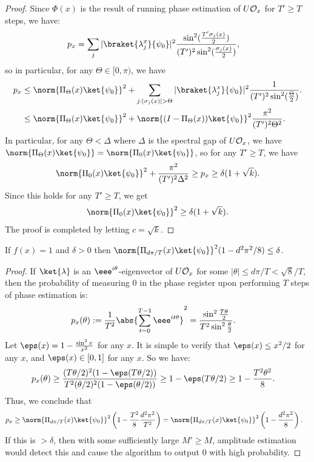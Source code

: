 \documentclass{toc}
\begin{document}
\begin{proof}
Since $\Phi(x)$ is the result of running phase estimation of $U{\cal O}_x$ for $T'\geq T$ steps, we have:
\begin{align*}
p_x &= \sum_j|\braket{\lambda_j^x}{\psi_0}|^2\frac{\sin^2(\frac{T'\sigma_j(x)}{2})}{(T')^2\sin^2(\frac{\sigma_j(x)}{2})},
\end{align*}
so in particular, for any $\Theta\in [0,\pi)$, we have
\begin{align*}
p_x &\leq \norm{\Pi_{\Theta}(x)\ket{\psi_0}}^2+\sum_{j:|\sigma_j(x)|>\Theta}|\braket{\lambda_j^x}{\psi_0}|^2\frac{1}{(T')^2\sin^2(\frac{\Theta}{2})}.\\
&\leq \norm{\Pi_\Theta(x)\ket{\psi_0}}^2 + \norm{(I-\Pi_\Theta(x))\ket{\psi_0}}^2\frac{\pi^2}{(T')^2\Theta^2}.
\end{align*}
In particular, for any $\Theta<\Delta$ where $\Delta$ is the spectral gap of $U{\cal O}_x$, we have $\norm{\Pi_\Theta(x)\ket{\psi_0}}=\norm{\Pi_0(x)\ket{\psi_0}}$, so for any $T'\geq T$, we have
$$\norm{\Pi_0(x)\ket{\psi_0}}^2+\frac{\pi^2}{(T')^2\Delta^2}\geq p_x\geq  \delta(1+\sqrt{k}).$$
Since this holds for any $T'\geq T$, we get
$$\norm{\Pi_0(x)\ket{\psi_0}}^2 \geq \delta(1+\sqrt{k}).$$
The proof is completed by letting $c=\sqrt{k}$.
\end{proof}

\begin{claim}
If $f(x)=1$ and $\delta>0$ then $\norm{\Pi_{d\pi/T}(x)\ket{\psi_0}}^2(1-d^2\pi^2/8)\leq \delta$.
\end{claim}
\begin{proof}
If $\ket{\lambda}$ is an $\eee^{i\theta}$-eigenvector of $U{\cal O}_x$ for some $|\theta|\leq d\pi/T < \sqrt{8}/T$, then the probability of measuring 0 in the phase register upon performing $T$ steps of phase estimation is:
\begin{align*}
p_x(\theta):=\frac{1}{T^2}\abs{\sum_{t=0}^{T-1}\eee^{it\theta}}^2 &= \frac{\sin^2\frac{T\theta}{2}}{T^2\sin^2\frac{\theta}{2}}.
\end{align*}
Let $\eps(x)=1-\frac{\sin^2x}{x^2}$ for any $x$. It is simple to verify that $\eps(x)\leq x^2/2$ for any $x$, and $\eps(x)\in [0,1]$ for any $x$. So we have:
\begin{align*}
p_x(\theta) &\geq \frac{(T\theta/2)^2(1-\eps(T\theta/2))}{T^2(\theta/2)^2(1-\eps(\theta/2))}
\geq 1-\eps(T\theta/2)
\geq 1-\frac{T^2\theta^2}{8}.
\end{align*}
Thus, we conclude that 
\begin{align*}
p_x &\geq \norm{\Pi_{d\pi/T}(x)\ket{\psi_0}}^2\left(1-\frac{T^2}{8}\frac{d^2\pi^2}{T^2}\right)
=\norm{\Pi_{d\pi/T}(x)\ket{\psi_0}}^2\left(1-\frac{d^2\pi^2}{8}\right).
\end{align*}
If this is $>\delta$, then with some sufficiently large $M'\geq M$, amplitude estimation would detect this and cause the algorithm to output 0 with high probability. 
\end{proof}
\end{document}
